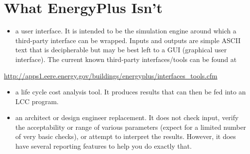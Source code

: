 \section{What EnergyPlus Isn't}\label{what-energyplus-isnt}

\begin{itemize}
\tightlist
\item
  a user interface. It is intended to be the simulation engine around which a third-party interface can be wrapped. Inputs and outputs are simple ASCII text that is decipherable but may be best left to a GUI (graphical user interface). The current known third-party interfaces/tools can be found at
\end{itemize}

\url{http://apps1.eere.energy.gov/buildings/energyplus/interfaces_tools.cfm}

\begin{itemize}
\item
  a life cycle cost analysis tool. It produces results that can then be fed into an LCC program.
\item
  an architect or design engineer replacement. It does not check input, verify the acceptability or range of various parameters (expect for a limited number of very basic checks), or attempt to interpret the results. However, it does have several reporting features to help you do exactly that.
\end{itemize}
